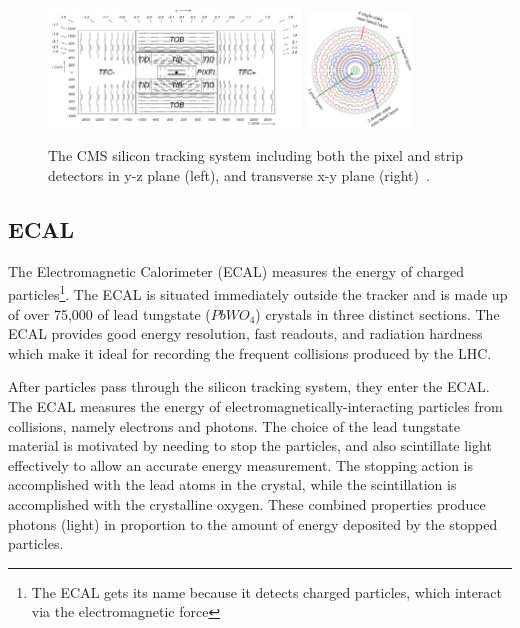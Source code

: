 \begin{figure}[hbtp]
 \begin{center}
   \includegraphics[width=0.6\textwidth]{ch3_figs/tracker_yz.pdf}
   \includegraphics[width=0.25\textwidth]{ch3_figs/tracker_transverse_layers.pdf}
   \caption[The CMS silicon tracking system]{The CMS silicon tracking system including both the pixel and strip detectors in y-z plane (left), and transverse x-y plane (right)~\cite{cms_bluebook}.}
   \label{fig:cms_tracker}
 \end{center}
\end{figure}

\subsection{ECAL}
The Electromagnetic Calorimeter (ECAL) measures the energy of charged particles\footnote{The ECAL gets its name because it detects charged particles, which interact via the
electromagnetic force}. The ECAL is situated immediately outside the tracker
and is made up of over 75,000 of lead tungstate ($PbWO_{4}$) crystals in three distinct sections. The ECAL provides good energy resolution, fast readouts, and radiation hardness
which make it ideal for recording the frequent collisions produced by the LHC. 

After particles pass through the silicon tracking system, they enter the ECAL. The ECAL measures the energy of electromagnetically-interacting particles from collisions, namely electrons and photons.
The choice of the lead tungstate material is motivated by needing to stop the particles, and also scintillate light effectively to allow an accurate energy measurement.
The stopping action is accomplished with the lead atoms in the crystal, while the scintillation is accomplished with
the crystalline oxygen. These combined properties produce photons (light) in proportion to the amount of energy deposited by the stopped particles.

